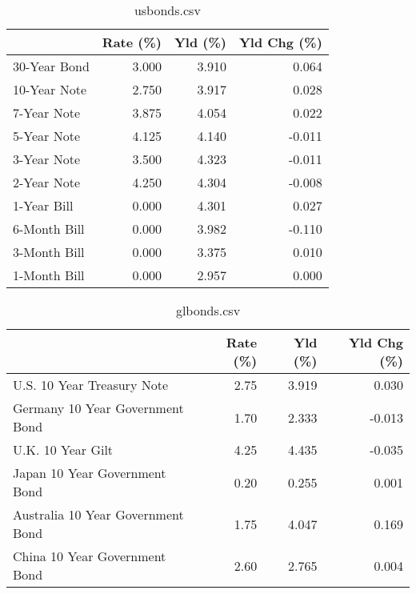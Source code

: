 \documentclass{article}%
\begin{document}
%


\begin{table}[htbp]%
\caption{usbonds.csv}%
\centering%
\begin{adjustbox}{width=1\textwidth}%
\begin{tabular}{lrrr}
\toprule
             &  Rate (\%) &  Yld (\%) &  Yld Chg (\%) \\
\midrule
30-Year Bond &     3.000 &    3.910 &        0.064 \\
10-Year Note &     2.750 &    3.917 &        0.028 \\
 7-Year Note &     3.875 &    4.054 &        0.022 \\
 5-Year Note &     4.125 &    4.140 &       -0.011 \\
 3-Year Note &     3.500 &    4.323 &       -0.011 \\
 2-Year Note &     4.250 &    4.304 &       -0.008 \\
 1-Year Bill &     0.000 &    4.301 &        0.027 \\
6-Month Bill &     0.000 &    3.982 &       -0.110 \\
3-Month Bill &     0.000 &    3.375 &        0.010 \\
1-Month Bill &     0.000 &    2.957 &        0.000 \\
\bottomrule
\end{tabular}
%
\end{adjustbox}%
\end{table}

%


\begin{table}[htbp]%
\caption{glbonds.csv}%
\centering%
\begin{adjustbox}{width=1\textwidth}%
\begin{tabular}{lrrr}
\toprule
                                  &  Rate (\%) &  Yld (\%) &  Yld Chg (\%) \\
\midrule
       U.S. 10 Year Treasury Note &      2.75 &    3.919 &        0.030 \\
  Germany 10 Year Government Bond &      1.70 &    2.333 &       -0.013 \\
                U.K. 10 Year Gilt &      4.25 &    4.435 &       -0.035 \\
    Japan 10 Year Government Bond &      0.20 &    0.255 &        0.001 \\
Australia 10 Year Government Bond &      1.75 &    4.047 &        0.169 \\
    China 10 Year Government Bond &      2.60 &    2.765 &        0.004 \\
\bottomrule
\end{tabular}
%
\end{adjustbox}%
\end{table}
\end{document}
